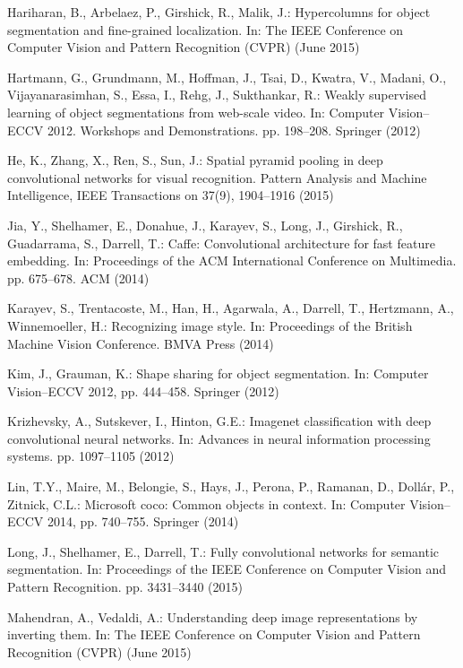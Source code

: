 \documentclass[runningheads]{llncs}
\begin{document}
\begin{thebibliography}{10}
Hariharan, B., Arbelaez, P., Girshick, R., Malik, J.: Hypercolumns for object
  segmentation and fine-grained localization. In: The IEEE Conference on
  Computer Vision and Pattern Recognition (CVPR) (June 2015)

Hartmann, G., Grundmann, M., Hoffman, J., Tsai, D., Kwatra, V., Madani, O.,
  Vijayanarasimhan, S., Essa, I., Rehg, J., Sukthankar, R.: Weakly supervised
  learning of object segmentations from web-scale video. In: Computer
  Vision--ECCV 2012. Workshops and Demonstrations. pp. 198--208. Springer
  (2012)

He, K., Zhang, X., Ren, S., Sun, J.: Spatial pyramid pooling in deep
  convolutional networks for visual recognition. Pattern Analysis and Machine
  Intelligence, IEEE Transactions on  37(9),  1904--1916 (2015)

Jia, Y., Shelhamer, E., Donahue, J., Karayev, S., Long, J., Girshick, R.,
  Guadarrama, S., Darrell, T.: Caffe: Convolutional architecture for fast
  feature embedding. In: Proceedings of the ACM International Conference on
  Multimedia. pp. 675--678. ACM (2014)

Karayev, S., Trentacoste, M., Han, H., Agarwala, A., Darrell, T., Hertzmann,
  A., Winnemoeller, H.: Recognizing image style. In: Proceedings of the British
  Machine Vision Conference. BMVA Press (2014)

Kim, J., Grauman, K.: Shape sharing for object segmentation. In: Computer
  Vision--ECCV 2012, pp. 444--458. Springer (2012)

Krizhevsky, A., Sutskever, I., Hinton, G.E.: Imagenet classification with deep
  convolutional neural networks. In: Advances in neural information processing
  systems. pp. 1097--1105 (2012)

Lin, T.Y., Maire, M., Belongie, S., Hays, J., Perona, P., Ramanan, D.,
  Doll{\'a}r, P., Zitnick, C.L.: Microsoft coco: Common objects in context. In:
  Computer Vision--ECCV 2014, pp. 740--755. Springer (2014)

Long, J., Shelhamer, E., Darrell, T.: Fully convolutional networks for semantic
  segmentation. In: Proceedings of the IEEE Conference on Computer Vision and
  Pattern Recognition. pp. 3431--3440 (2015)

Mahendran, A., Vedaldi, A.: Understanding deep image representations by
  inverting them. In: The IEEE Conference on Computer Vision and Pattern
  Recognition (CVPR) (June 2015)


\end{thebibliography}
\end{document}
